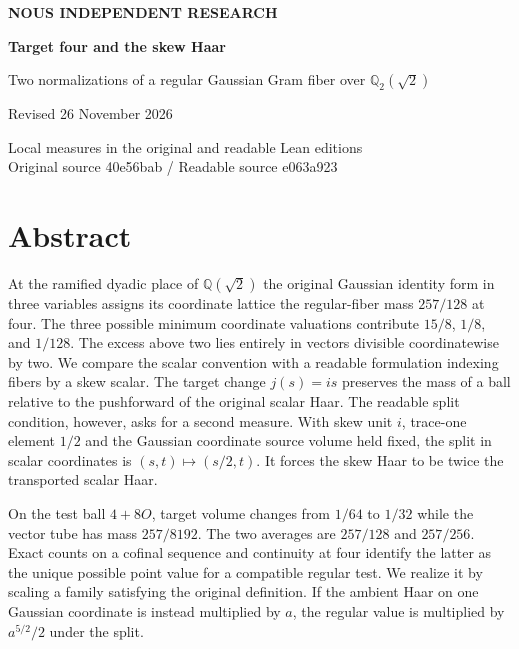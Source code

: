 \documentclass[12pt,letterpaper]{article}
\begin{document}
\thispagestyle{empty}
\begin{center}\vspace*{.46in}
{\sffamily\small\bfseries\color{accent}NOUS INDEPENDENT RESEARCH}\par\vspace{.51in}
{\fontsize{32}{38}\selectfont\bfseries\color{ink}Target four and the skew Haar}\par\vspace{.24in}
\begin{minipage}{.91\linewidth}\centering\Large Two normalizations of a regular Gaussian Gram fiber over $\mathbb Q_2(\sqrt2)$\end{minipage}
\par\vspace{.35in}
\par\vspace{.45in}{\large Justin Candler with Uriel, AI research assistant}\par Revised 26 November 2026
\end{center}\vfill
\begin{center}\small\sffamily Local measures in the original and readable Lean editions\\
Original source 40e56bab \enspace / \enspace Readable source e063a923\end{center}
\clearpage
\section*{Abstract}
At the ramified dyadic place of $\mathbb Q(\sqrt2)$ the original Gaussian identity form in three variables assigns its coordinate lattice the regular-fiber mass $257/128$ at four. The three possible minimum coordinate valuations contribute $15/8$, $1/8$, and $1/128$. The excess above two lies entirely in vectors divisible coordinatewise by two. We compare the scalar convention with a readable formulation indexing fibers by a skew scalar. The target change $j(s)=is$ preserves the mass of a ball relative to the pushforward of the original scalar Haar. The readable split condition, however, asks for a second measure. With skew unit $i$, trace-one element $1/2$ and the Gaussian coordinate source volume held fixed, the split in scalar coordinates is $(s,t)\mapsto(s/2,t)$. It forces the skew Haar to be twice the transported scalar Haar.

On the test ball $4+8O$, target volume changes from $1/64$ to $1/32$ while the vector tube has mass $257/8192$. The two averages are $257/128$ and $257/256$. Exact counts on a cofinal sequence and continuity at four identify the latter as the unique possible point value for a compatible regular test. We realize it by scaling a family satisfying the original definition. If the ambient Haar on one Gaussian coordinate is instead multiplied by $a$, the regular value is multiplied by $a^{5/2}/2$ under the split.
\end{document}
